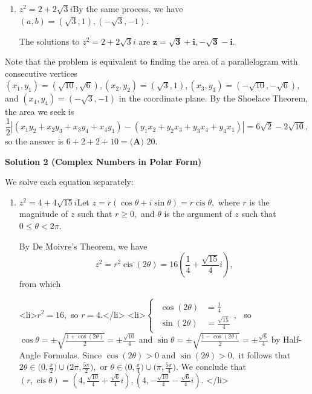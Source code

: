 \begin{enumerate}
\begin{enumerate}
 The solutions to $z^2=4+4\sqrt{15}i$ are $\boldsymbol{z=\sqrt{10}+\sqrt{6}i,-\sqrt{10}-\sqrt{6}i}.$


        \item $z^2=2+2\sqrt{3}i$By the same process, we have $(a,b)=\left(\sqrt3,1\right),\left(-\sqrt3,-1\right).$ 

 The solutions to $z^2=2+2\sqrt{3}i$ are $\boldsymbol{z=\sqrt3+i,-\sqrt3-i}.$

            \end{enumerate}
            Note that the problem is equivalent to finding the area of a parallelogram with consecutive vertices $(x_1,y_1)=\left(\sqrt{10}, \sqrt{6}\right),(x_2,y_2)=\left(\sqrt{3},1\right),(x_3,y_3)=\left(-\sqrt{10},-\sqrt{6}\right),$ and $(x_4,y_4)=\left(-\sqrt{3}, -1\right)$ in the coordinate plane. By the Shoelace Theorem, the area we seek is 
 \[\frac{1}{2} \left|(x_1y_2 + x_2y_3 + x_3y_4 + x_4y_1) - (y_1x_2 + y_2x_3 + y_3x_4 + y_4x_1)\right| = 6\sqrt2-2\sqrt{10},\] so the answer is $6+2+2+10=\boxed{\textbf{(A) } 20}.$




\textbf{Solution 2 (Complex Numbers in Polar Form)}

We solve each equation separately:

 
            \begin{enumerate} 
        \item $z^2=4+4\sqrt{15}i$Let $z=r(\cos\theta+i\sin\theta)=r\operatorname{cis}\theta,$ where $r$ is the magnitude of $z$ such that $r\geq0,$ and $\theta$ is the argument of $z$ such that $0\leq\theta<2\pi.$ 

 By De Moivre's Theorem, we have 
 \[z^2=r^2\operatorname{cis}(2\theta)=16\left(\frac14+\frac{\sqrt{15}}{4}i\right),\] from which

 
            \begin{itemize} <li>$r^2=16,$ so $r=4.$</li>
<li>$\begin{cases} \begin{aligned} \cos(2\theta) &= \frac14 \\ \sin(2\theta) &= \frac{\sqrt{15}}{4} \end{aligned}, \end{cases}$ so $\cos\theta=\pm\sqrt{\frac{1+\cos(2\theta)}{2}}=\pm\frac{\sqrt{10}}{4}$ and $\sin\theta=\pm\sqrt{\frac{1-\cos(2\theta)}{2}}=\pm\frac{\sqrt{6}}{4}$ by Half-Angle Formulas. 
Since $\cos(2\theta)>0$ and $\sin(2\theta)>0,$ it follows that $2\theta\in\biggl(0,\frac{\pi}{2}\biggr)\cup\biggl(2\pi,\frac{5\pi}{2}\biggr),$ or $\theta\in\biggl(0,\frac{\pi}{4}\biggr)\cup\biggl(\pi,\frac{5\pi}{4}\biggr).$ We conclude that $(r,\operatorname{cis}\theta)=\left(4,\frac{\sqrt{10}}{4}+\frac{\sqrt{6}}{4}i\right),\left(4,-\frac{\sqrt{10}}{4}-\frac{\sqrt{6}}{4}i\right).$ </li>


\end{itemize}
\end{enumerate}
\end{enumerate}
